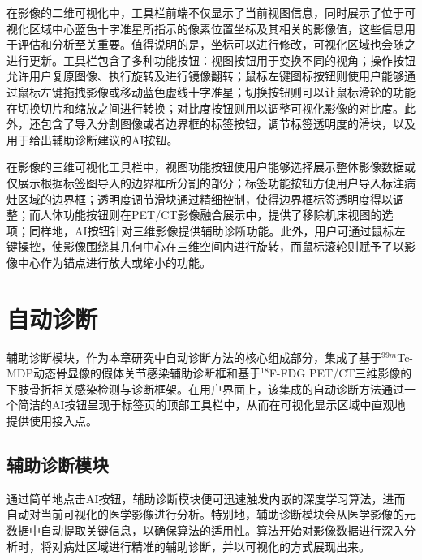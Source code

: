 在影像的二维可视化中，工具栏前端不仅显示了当前视图信息，同时展示了位于可视化区域中心蓝色十字准星所指示的像素位置坐标及其相关的影像值，这些信息用于评估和分析至关重要。值得说明的是，坐标可以进行修改，可视化区域也会随之进行更新。工具栏包含了多种功能按钮：视图按钮用于变换不同的视角；操作按钮允许用户复原图像、执行旋转及进行镜像翻转；鼠标左键图标按钮则使用户能够通过鼠标左键拖拽影像或移动蓝色虚线十字准星；切换按钮则可以让鼠标滑轮的功能在切换切片和缩放之间进行转换；对比度按钮则用以调整可视化影像的对比度。此外，还包含了导入分割图像或者边界框的标签按钮，调节标签透明度的滑块，以及用于给出辅助诊断建议的AI按钮。

在影像的三维可视化工具栏中，视图功能按钮使用户能够选择展示整体影像数据或仅展示根据标签图导入的边界框所分割的部分；标签功能按钮方便用户导入标注病灶区域的边界框；透明度调节滑块通过精细控制，使得边界框标签透明度得以调整；而人体功能按钮则在PET/CT影像融合展示中，提供了移除机床视图的选项；同样地，AI按钮针对三维影像提供辅助诊断功能。此外，用户可通过鼠标左键操控，使影像围绕其几何中心在三维空间内进行旋转，而鼠标滚轮则赋予了以影像中心作为锚点进行放大或缩小的功能。

\section{自动诊断}


辅助诊断模块，作为本章研究中自动诊断方法的核心组成部分，集成了基于\(^{99m}\)Tc-MDP动态骨显像的假体关节感染辅助诊断框和基于\(^{18}\)F-FDG PET/CT三维影像的下肢骨折相关感染检测与诊断框架。在用户界面上，该集成的自动诊断方法通过一个简洁的AI按钮呈现于标签页的顶部工具栏中，从而在可视化显示区域中直观地提供使用接入点。

\subsection{辅助诊断模块}

通过简单地点击AI按钮，辅助诊断模块便可迅速触发内嵌的深度学习算法，进而自动对当前可视化的医学影像进行分析。特别地，辅助诊断模块会从医学影像的元数据中自动提取关键信息，以确保算法的适用性。算法开始对影像数据进行深入分析时，将对病灶区域进行精准的辅助诊断，并以可视化的方式展现出来。

